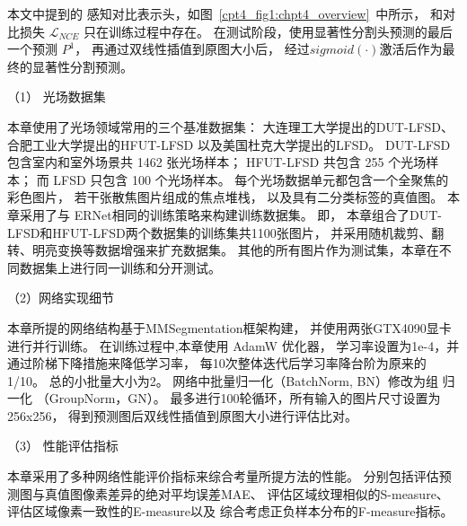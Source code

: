 


本文中提到的
感知对比表示头，如图~\ref{cpt4_fig1:chpt4_overview}~中所示，
和对比损失 $\mathcal{L}_{NCE}$
只在训练过程中存在。
在测试阶段，使用显著性分割头预测的最后一个预测 $P^{1}$， 再通过双线性插值到原图大小后，
经过$sigmoid(\cdot)$激活后作为最终的显著性分割预测。







（1）
光场数据集


本章使用了光场领域常用的三个基准数据集：
大连理工大学提出的DUT-LFSD、
合肥工业大学提出的HFUT-LFSD
以及美国杜克大学提出的LFSD。
DUT-LFSD 包含室内和室外场景共 1462 张光场样本；
HFUT-LFSD 共包含 255 个光场样本；
而 LFSD 只包含 100 个光场样本。
每个光场数据单元都包含一个全聚焦的彩色图片，
若干张散焦图片组成的焦点堆栈，
以及具有二分类标签的真值图。
本章采用了与 ERNet相同的训练策略来构建训练数据集。
即，
本章组合了DUT-LFSD和HFUT-LFSD两个数据集的训练集共1100张图片，
并采用随机裁剪、翻转、明亮变换等数据增强来扩充数据集。
其他的所有图片作为测试集，本章在不同数据集上进行同一训练和分开测试。



（2）网络实现细节


本章所提的网络结构基于MMSegmentation框架构建，
并使用两张GTX4090显卡进行并行训练。
在训练过程中,本章使用 AdamW 优化器，
学习率设置为1e-4，并通过阶梯下降措施来降低学习率，
每10次整体迭代后学习率降台阶为原来的1/10。
总的小批量大小为2。
网络中批量归一化（BatchNorm, BN）修改为组
归一化 （GroupNorm，GN）。
最多进行100轮循环，所有输入的图片尺寸设置为 256x256，
得到预测图后双线性插值到原图大小进行评估比对。



（3）
性能评估指标


本章采用了多种网络性能评价指标来综合考量所提方法的性能。
分别包括评估预测图与真值图像素差异的绝对平均误差MAE、
评估区域纹理相似的S-measure、
评估区域像素一致性的E-measure以及
综合考虑正负样本分布的F-measure指标。






